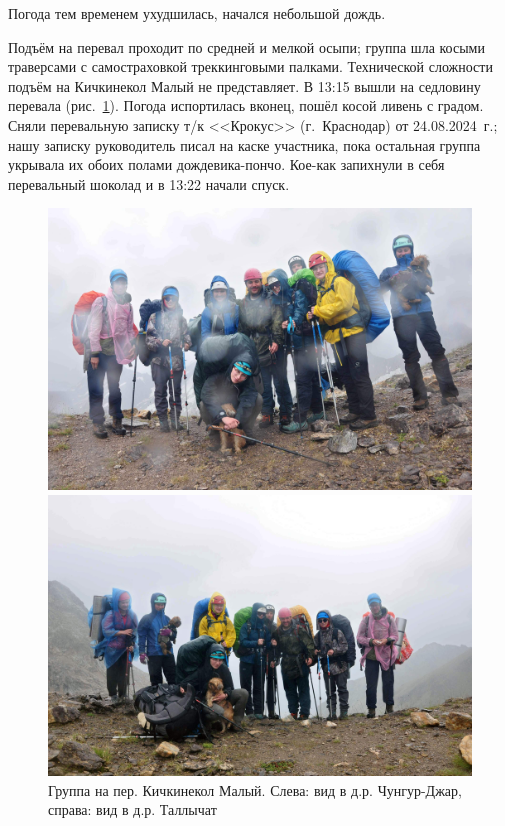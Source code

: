 Погода тем временем ухудшилась, начался небольшой дождь.

Подъём на перевал проходит по средней и мелкой осыпи; группа шла косыми траверсами с самостраховкой треккинговыми палками. Технической сложности подъём на Кичкинекол Малый не представляет.
В 13:15 вышли на седловину перевала (рис.~\ref{fig:DSC_0239}). Погода испортилась вконец, пошёл косой ливень с градом. Сняли перевальную записку т/к <<Крокус>> (г.~Краснодар) от 24.08.2024~г.; нашу записку руководитель писал на каске участника, пока остальная группа укрывала их обоих полами дождевика-пончо. Кое-как запихнули в себя перевальный шоколад и в 13:22 начали спуск.


\begin{figure}[h!]
	\centering
	\begin{minipage}[h]{0.48\linewidth}
		\includegraphics[width=0.99\linewidth]{../pics/DSC_0239.jpg}
	\end{minipage}
	\quad
	\begin{minipage}[h]{0.48\linewidth}
		\includegraphics[width=0.99\linewidth]{../pics/DSC_0242.jpg}
	\end{minipage}
	\caption{Группа на пер. Кичкинекол Малый. Слева: вид в д.р. Чунгур-Джар, справа: вид в д.р. Таллычат}
	\label{fig:DSC_0239}
\end{figure}

